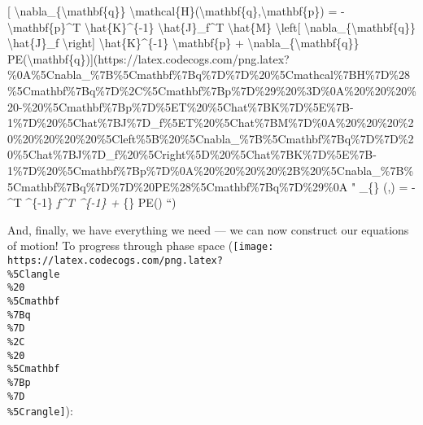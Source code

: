 \documentclass[]{article}
\begin{document}
{[} \textbackslash{}nabla\_\{\textbackslash{}mathbf\{q\}\}
\textbackslash{}mathcal\{H\}(\textbackslash{}mathbf\{q\},\textbackslash{}mathbf\{p\})
= - \textbackslash{}mathbf\{p\}\^{}T \textbackslash{}hat\{K\}\^{}\{-1\}
\textbackslash{}hat\{J\}\_f\^{}T \textbackslash{}hat\{M\}
\textbackslash{}left{[} \textbackslash{}nabla\_\{\textbackslash{}mathbf\{q\}\}
\textbackslash{}hat\{J\}\_f \textbackslash{}right{]}
\textbackslash{}hat\{K\}\^{}\{-1\} \textbackslash{}mathbf\{p\} +
\textbackslash{}nabla\_\{\textbackslash{}mathbf\{q\}\}
PE(\textbackslash{}mathbf\{q\}){]}(https://latex.codecogs.com/png.latex?\%0A\%5Cnabla\_\%7B\%5Cmathbf\%7Bq\%7D\%7D\%20\%5Cmathcal\%7BH\%7D\%28\%5Cmathbf\%7Bq\%7D\%2C\%5Cmathbf\%7Bp\%7D\%29\%20\%3D\%0A\%20\%20\%20\%20-\%20\%5Cmathbf\%7Bp\%7D\%5ET\%20\%5Chat\%7BK\%7D\%5E\%7B-1\%7D\%20\%5Chat\%7BJ\%7D\_f\%5ET\%20\%5Chat\%7BM\%7D\%0A\%20\%20\%20\%20\%20\%20\%20\%20\%5Cleft\%5B\%20\%5Cnabla\_\%7B\%5Cmathbf\%7Bq\%7D\%7D\%20\%5Chat\%7BJ\%7D\_f\%20\%5Cright\%5D\%20\%5Chat\%7BK\%7D\%5E\%7B-1\%7D\%20\%5Cmathbf\%7Bp\%7D\%0A\%20\%20\%20\%20\%2B\%20\%5Cnabla\_\%7B\%5Cmathbf\%7Bq\%7D\%7D\%20PE\%28\%5Cmathbf\%7Bq\%7D\%29\%0A
" \nabla\_\{\} (,) = - \^{}T
\^{}\{-1\} \emph{f\^{}T 
 \^{}\{-1\}  +
\nabla}\{\} PE() ``)

And, finally, we have everything we need --- we can now construct our equations
of motion! To progress through phase space
(\texttt{[image: https://latex.codecogs.com/png.latex?\\\%5Clangle\\\%20\\\%5Cmathbf\\\%7Bq\\\%7D\\\%2C\\\%20\\\%5Cmathbf\\\%7Bp\\\%7D\\\%5Crangle]}):
\end{document}
